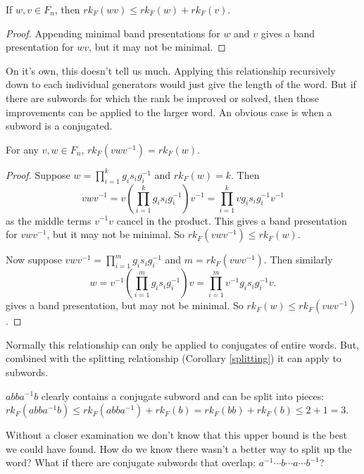 \documentclass[12pt]{thesis}
\begin{document}
\begin{corollary}
    \label{splitting}
    If $w, v \in F_{n}$, then
    $rk_{F}(wv) \leq rk_{F}(w) + rk_{F}(v)$.
\end{corollary}

\begin{proof}
    Appending minimal band presentations for $w$ and $v$
    gives a band presentation for $wv$, but it may not be minimal.
\end{proof}

On it's own, this doesn't tell us much.
Applying this relationship recursively down to each individual generators would just give the length
of the word.
But if there are subwords for which the rank be improved or solved,
then those improvements can be applied to the larger word.
An obvious case is when a subword is a conjugated.

\begin{proposition}
    \label{conjugating}
    For any $v, w \in F_{n}$, $rk_{F}(vwv^{-1}) = rk_{F}(w)$.
\end{proposition}

\begin{proof}
    Suppose $w = \prod_{i=1}^{k} g_{i}s_{i}g_{i}^{-1}$
    and $rk_{F}(w) = k$.
    Then 
    \[
        vwv^{-1}  = v(\prod_{i=1}^{k} g_{i}s_{i}g_{i}^{-1})v^{-1} = \prod_{i=1}^{k} vg_{i}s_{i}g_{i}^{-1}v^{-1}
    \]
    as the middle terms $v^{-1}v$ cancel in the product.
    This gives a band presentation for $vwv^{-1}$,
    but it may not be minimal.
    So $rk_{F}(vwv^{-1}) \leq rk_{F}(w)$.

    Now suppose $vwv^{-1} = \prod_{i=1}^{m} g_{i}s_{i}g_{i}^{-1}$
    and $m = rk_{F}(vwv^{-1})$.
    Then similarly
    \[
        w = v^{-1}(\prod_{i=1}^{m} g_{i}s_{i}g_{i}^{-1})v = \prod_{i=1}^{m} v^{-1}g_{i}s_{i}g_{i}^{-1}v.
    \]
    gives a band presentation, but may not be minimal.
    So $rk_{F}(w) \leq rk_{F}(vwv^{-1})$.
\end{proof}

Normally this relationship can only
be applied to conjugates of entire words. But, combined with the splitting relationship (Corollary \ref{splitting}) it can
apply to subwords.
\begin{example}
$a b b a^{-1} b$ clearly contains a conjugate subword and can be split into pieces:
$rk_{F}(a b b a^{-1} b) \leq rk_{F}(a b b a^{-1})  + rk_{F}(b) = rk_{F}(b b) + rk_{F}(b) \leq 2 + 1 = 3$. 
\end{example}

Without a closer examination we don't
know that this upper bound is the best we could have found.
How do we know there wasn't a better way to split up the word?
What if there are conjugate subwords that overlap: $a^{-1} \cdots b \cdots a \cdots b^{-1}$?
\end{document}
